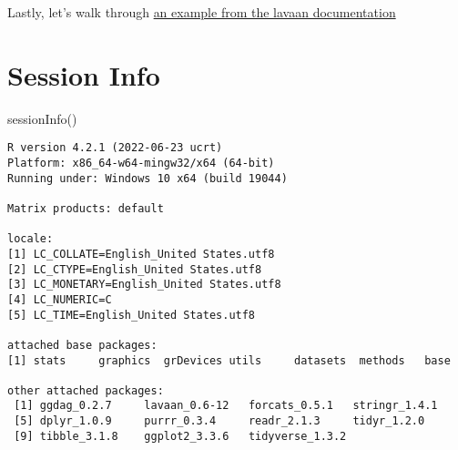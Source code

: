 \documentclass[
  letterpaper,
  DIV=11,
  numbers=noendperiod]{scrreprt}
\newenvironment{Shaded}{\begin{snugshade}}{\end{snugshade}}
\newcommand{\FunctionTok}[1]{\textcolor[rgb]{0.28,0.35,0.67}{#1}}
\newcommand{\NormalTok}[1]{\textcolor[rgb]{0.00,0.23,0.31}{#1}}
\begin{document}
Lastly, let's walk through
\href{https://www.lavaan.ugent.be/tutorial/cfa.html}{an example from the
lavaan documentation}

\hypertarget{session-info}{%
\section{Session Info}\label{session-info}}

\begin{Shaded}
\begin{Highlighting}[]
\FunctionTok{sessionInfo}\NormalTok{()}
\end{Highlighting}
\end{Shaded}

\begin{verbatim}
R version 4.2.1 (2022-06-23 ucrt)
Platform: x86_64-w64-mingw32/x64 (64-bit)
Running under: Windows 10 x64 (build 19044)

Matrix products: default

locale:
[1] LC_COLLATE=English_United States.utf8 
[2] LC_CTYPE=English_United States.utf8   
[3] LC_MONETARY=English_United States.utf8
[4] LC_NUMERIC=C                          
[5] LC_TIME=English_United States.utf8    

attached base packages:
[1] stats     graphics  grDevices utils     datasets  methods   base     

other attached packages:
 [1] ggdag_0.2.7     lavaan_0.6-12   forcats_0.5.1   stringr_1.4.1  
 [5] dplyr_1.0.9     purrr_0.3.4     readr_2.1.3     tidyr_1.2.0    
 [9] tibble_3.1.8    ggplot2_3.3.6   tidyverse_1.3.2


\end{verbatim}
\end{document}
